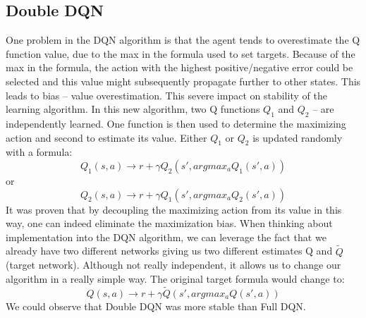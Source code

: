 \subsection{Double DQN}
One problem in the DQN algorithm is that the agent tends to overestimate the Q function value, due to the max in the formula used to set targets.
Because of the max in the formula, the action with the highest positive/negative error could be selected and this value might subsequently propagate further to other states. This leads to bias – value overestimation. This severe impact on stability of the learning algorithm.
\newline
In this new algorithm, two Q functions $Q_{1}$ and $Q_2$ – are independently learned. One function is then used to determine the maximizing action and second to estimate its value. Either $Q_1$ or $Q_2$ is updated randomly with a formula:
\begin{equation}
Q_1(s, a) \xrightarrow{} r + \gamma Q_2(s', argmax_a Q_1(s', a)) 
\end{equation}
or
\begin{equation}
Q_2(s, a) \xrightarrow{} r + \gamma Q_1(s', argmax_a Q_2(s', a)) 
\end{equation}
It was proven that by decoupling the maximizing action from its value in this way, one can indeed eliminate the maximization bias.
\newline
When thinking about implementation into the DQN algorithm, we can leverage the fact that we already have two different networks giving us two different estimates Q and $\tilde{Q}$ (target network). Although not really independent, it allows us to change our algorithm in a really simple way.
\newline
The original target formula would change to:
\begin{equation}
Q(s, a) \xrightarrow{} r + \gamma \tilde{Q}(s', argmax_a Q(s', a))
\end{equation}
We could observe that Double DQN was more stable than Full DQN.
 
